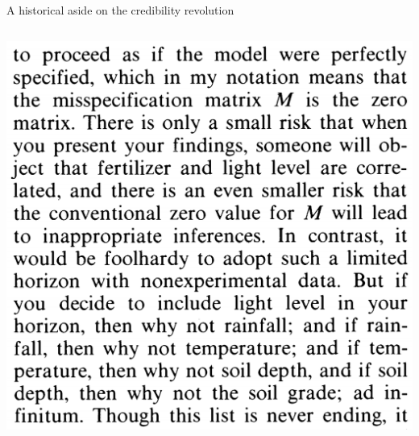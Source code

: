 \documentclass[notes,11pt, aspectratio=169]{beamer}
\begin{document}
\begin{frame}{A historical aside on the credibility revolution}
\begin{columns}[T]
\begin{column}{.6\textwidth}
\begin{center}
{    \includegraphics[width=0.55\linewidth]{images/leamer5b.png}}
  \end{center}
\end{column}%
\end{columns}
\end{frame}
\end{document}

